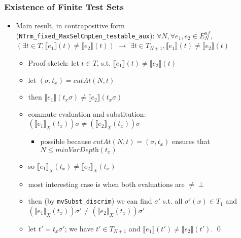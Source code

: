 \documentclass{beamer}
\begin{document}
\begin{frame}
  \frametitle{Existence of Finite Test Sets}
  \begin{itemize}
    \item Main result, in contrapositive form (\texttt{NTrm\_fixed\_MaxSelCmpLen\_testable\_aux}):
      $\forall N, \forall e_1, e_2 \in E^{nf}_N,$
      $(\exists t \in T, \llbracket e_1 \rrbracket (t) \neq \llbracket e_2 \rrbracket (t))$
      $\rightarrow$
      $\exists t \in T_{N+1}, \llbracket e_1 \rrbracket (t) \neq \llbracket e_2 \rrbracket (t)$
      \pause
	  \begin{itemize}
	    \item Proof sketch: let $t \in T$, s.t. $\llbracket e_1 \rrbracket (t) \neq \llbracket e_2 \rrbracket (t)$
	    \pause
	    \item let $(\sigma, t_x) = \mathit{cutAt}(N, t)$
	    \item then $\llbracket e_1 \rrbracket (t_x \sigma) \neq \llbracket e_2 \rrbracket (t_x \sigma)$
	    \pause
	    \item commute evaluation and substitution: 
	      $(\llbracket e_1 \rrbracket_X (t_x))\sigma \neq (\llbracket e_2 \rrbracket_X (t_x)) \sigma$
	      \begin{itemize}
	        \item possible because $\mathit{cutAt}(N, t) = (\sigma, t_x)$
			  ensures that $N \le \textit{minVarDepth}(t_x)$
	      \end{itemize}  
	    \pause
	    \item so $\llbracket e_1 \rrbracket_X (t_x) \neq \llbracket e_2 \rrbracket_X (t_x)$
	    \pause
	    \item most interesting case is when both evaluations are $\neq \perp$
	    \item then (by \texttt{mvSubst\_discrim}) we can find $\sigma'$ s.t.
	      all $\sigma'(x) \in T_1$ and 
	      $(\llbracket e_1 \rrbracket_X (t_x))\sigma' \neq (\llbracket e_2 \rrbracket_X (t_x)) \sigma'$
	    \pause
	    \item let $t' = t_x \sigma'$; we have $t' \in T_{N+1}$ and 
	      $\llbracket e_1 \rrbracket (t') \neq \llbracket e_2 \rrbracket (t')$. \qed
	  \end{itemize}
  \end{itemize}
\end{frame}
\end{document}
